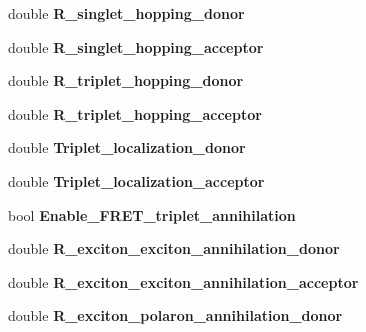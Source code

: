 \begin{DoxyCompactItemize}
\mbox{\label{struct_parameters___o_p_v_a292a5caeb412ff44bb829d06f22eebac}} 
double {\bfseries R\+\_\+singlet\+\_\+hopping\+\_\+donor}
\item 
\mbox{\label{struct_parameters___o_p_v_addf89db7c365dc9c1c0ed5ac405c6e79}} 
double {\bfseries R\+\_\+singlet\+\_\+hopping\+\_\+acceptor}
\item 
\mbox{\label{struct_parameters___o_p_v_a8de2d7b5eac87daa32ece5ff4ec81917}} 
double {\bfseries R\+\_\+triplet\+\_\+hopping\+\_\+donor}
\item 
\mbox{\label{struct_parameters___o_p_v_a6e99571da45591efb83182cd95b72884}} 
double {\bfseries R\+\_\+triplet\+\_\+hopping\+\_\+acceptor}
\item 
\mbox{\label{struct_parameters___o_p_v_a5b7e58b86bfd90243849862f074ebf51}} 
double {\bfseries Triplet\+\_\+localization\+\_\+donor}
\item 
\mbox{\label{struct_parameters___o_p_v_aac11d663f53039160f936a5c670151ed}} 
double {\bfseries Triplet\+\_\+localization\+\_\+acceptor}
\item 
\mbox{\label{struct_parameters___o_p_v_a2d31dc44f632afe90ee6218ac3509a5d}} 
bool {\bfseries Enable\+\_\+\+F\+R\+E\+T\+\_\+triplet\+\_\+annihilation}
\item 
\mbox{\label{struct_parameters___o_p_v_a66580234d20375c017a3e9bad303062d}} 
double {\bfseries R\+\_\+exciton\+\_\+exciton\+\_\+annihilation\+\_\+donor}
\item 
\mbox{\label{struct_parameters___o_p_v_ad6159c82da14b1d66e1afd03d6e4bc00}} 
double {\bfseries R\+\_\+exciton\+\_\+exciton\+\_\+annihilation\+\_\+acceptor}
\item 
\mbox{\label{struct_parameters___o_p_v_ad4e469469b09cf493dc46a4ca1f60705}} 
double {\bfseries R\+\_\+exciton\+\_\+polaron\+\_\+annihilation\+\_\+donor}
\item 

\end{DoxyCompactItemize}
